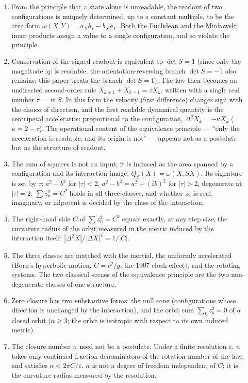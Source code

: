\documentclass[
  a4paper,
]{article}
\providecommand{\tightlist}{%
  \setlength{\itemsep}{0pt}\setlength{\parskip}{0pt}}
\begin{document}
\begin{enumerate}
\def\labelenumi{\arabic{enumi}.}
\tightlist
\item
  From the principle that a state alone is unreadable, the readout of
  two configurations is uniquely determined, up to a constant multiple,
  to be the area form \(\omega(X,Y)=a_Xb_Y-b_Xa_Y\). Both the Euclidean
  and the Minkowski inner products assign a value to a single
  configuration, and so violate the principle.
\item
  Conservation of the signed readout is equivalent to \(\det S=1\)
  (since only the magnitude \(\lvert q\rvert\) is readable, the
  orientation-reversing branch \(\det S=-1\) also remains; this paper
  treats the branch \(\det S=1\)). The law then becomes an undirected
  second-order rule \(X_{k+1}+X_{k-1}=\tau X_k\), written with a single
  real number \(\tau=\operatorname{tr}S\). In this form the velocity
  (first difference) changes sign with the choice of direction, and the
  first readable dynamical quantity is the centripetal acceleration
  proportional to the configuration, \(\Delta^2X_k=-\kappa X_k\)
  (\(\kappa=2-\tau\)). The operational content of the equivalence
  principle --- ``only the acceleration is readable, and its origin is
  not'' --- appears not as a postulate but as the structure of readout.
\item
  The sum of squares is not an input; it is induced as the area spanned
  by a configuration and its interaction image, \(Q_S(X)=\omega(X,SX)\).
  Its signature is set by \(\tau\): \(a^2+b^2\) for \(|\tau|<2\),
  \(a^2-b^2=a^2+(ib)^2\) for \(|\tau|>2\), degenerate at \(|\tau|=2\).
  \(\sum z_n^2=C^2\) holds in all three classes, and whether \(z_2\) is
  real, imaginary, or nilpotent is decided by the class of the
  interaction.
\item
  The right-hand side \(C\) of \(\sum z_n^2=C^2\) equals exactly, at any
  step size, the curvature radius of the orbit measured in the metric
  induced by the interaction itself: \(|\Delta^2X|/|\Delta X|^2=1/|C|\).
\item
  The three classes are matched with the inertial, the uniformly
  accelerated (Born's hyperbolic motion, \(C=c^2/g\), the 1907 clock
  effect), and the rotating systems. The two classical scenes of the
  equivalence principle are the two non-degenerate classes of one
  structure.
\item
  Zero closure has two substantive forms: the null cone (configurations
  whose direction is unchanged by the interaction), and the orbit sum
  \(\sum_k z_k^2=0\) of a closed orbit (\(n\ge3\); the orbit is
  isotropic with respect to its own induced metric).
\item
  The closure number \(n\) need not be a postulate. Under a finite
  resolution \(\varepsilon\), \(n\) takes only continued-fraction
  denominators of the rotation number of the law, and satisfies
  \(n<2\pi C/\varepsilon\). \(n\) is not a degree of freedom independent
  of \(C\); it is the curvature radius measured by the resolution.
\end{enumerate}
\end{document}
